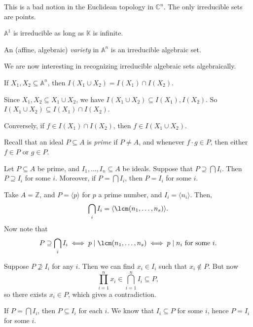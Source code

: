 \documentclass[12pt]{article}
\begin{document}
\begin{remark}
	This is a bad notion in the Euclidean topology in $\mathbb{C}^n$. The only irreducible sets are points.
\end{remark}

\begin{exbox}
	$\mathbb{A}^1$ is irreducible as long as $\mathbb{K}$ is infinite.
\end{exbox}

\begin{definition}
	An (affine, algebraic) \emph{variety} in $\mathbb{A}^n$ is an irreducible algebraic set.
\end{definition}

We are now interesting in recognizing irreducible algebraic sets algebraically.

\begin{proposition}
	If $X_1, X_2 \subseteq \mathbb{A}^n$, then $I(X_1 \cup X_2) = I(X_1) \cap I(X_2)$.
\end{proposition}

\begin{proofbox}
	Since $X_1, X_2 \subseteq X_1 \cup X_2$, we have $I(X_1 \cup X_2) \subseteq I(X_1), I(X_2)$. So $I(X_1 \cup X_2) \subseteq I(X_1) \cap I(X_2)$.

	Conversely, if $f \in I(X_1) \cap I(X_2)$, then $f \in I(X_1 \cup X_2)$.
\end{proofbox}

Recall that an ideal $P \subseteq A$ is \emph{prime} if $P \neq A$, and whenever $f \cdot g \in P$, then either $f \in P$ or $g \in P$.

\begin{lemma}
	Let $P \subseteq A$ be prime, and $I_1, \ldots, I_n \subseteq A$ be ideals. Suppose that $P \supseteq \bigcap I_i$. Then $P \supseteq I_i$ for some $i$. Moreover, if $P = \bigcap I_i$, then $P = I_i$ for some $i$.
\end{lemma}

\begin{exbox}
	Take $A = \mathbb{Z}$, and $P = \langle p\rangle$ for $p$ a prime number, and $I_i = \langle n_i \rangle$. Then,
	\[
	\bigcap_i I_i = \langle \lcm(n_1, \ldots, n_s)\rangle.
	\]
	Now note that
	\[
		P \supseteq \bigcap_i I_i \iff p \mid \lcm(n_1, \ldots, n_s) \iff p \mid n_i \text{ for some } i.
	\]
\end{exbox}

\begin{proofbox}
	Suppose $P \not \supseteq I_i$ for any $i$. Then we can find $x_i \in I_i$ such that $x_i \not \in P$. But now
	\[
	\prod_{i = 1}^n x_i \in \bigcap_{i = 1}^n I_i \subseteq P,
	\]
	so there exists $x_i \in P$, which gives a contradiction.

	If $P = \bigcap I_i$, then $P \subseteq I_i$ for each $i$. We know that $I_i \subseteq P$ for some $i$, hence $P = I_i$ for some $i$.
\end{proofbox}
\end{document}
